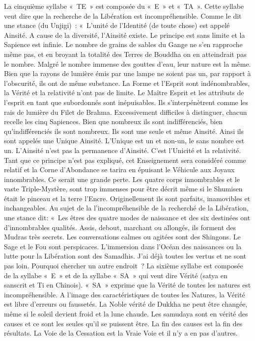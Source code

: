 La cinquième syllabe « TE » est composée du « E » et « TA ». Cette syllabe veut dire que la recherche de la Libération est incompréhensible. Comme le dit une stance (du Unjigi) : « L’unité de l’Identité (de toute chose) est appelé Ainsité. A cause de la diversité, l’Ainsité existe. Le principe est sans limite et la Sapience est infinie. Le nombre de grains de sables du Gange ne s’en rapproche même pas, et en broyant la totalité des Terres de Bouddha on en atteindrait pas le nombre. Malgré le nombre immense des gouttes d’eau, leur nature est la même. Bien que la rayons de lumière émis par une lampe ne soient pas un, par rapport à l’obscurité, ils ont de même substance. La Forme et l’Esprit sont indénombrables, la Vérité et la relativité n’ont pas de limite. Le Maître Esprit et les attributs de l’esprit en tant que subordonnés sont inépuisables. Ils s’interpénètrent comme les rais de lumière du Filet de Brahma. Excessivement difficiles à distinguer, chacun recelle les cinq Sapiences. Bien que nombreux ils sont indifférenciés, bien qu’indifférenciés ils sont nombreux. Ils sont une seule et même Ainsité. Ainsi ils sont appelés une Unique Ainsité. L’Unique est un et non-un, le sans nombre est un. L’Ainsité n’est pas la permanence d’Ainsité. C’est l’Unicité et la relativité. Tant que ce principe n’est pas expliqué, cet Enseignement sera considéré comme relatif et la Corne d’Abondance se tarira en épuisant le Véhicule aux Joyaux innombrables. Ce serait une grande perte.
 Les quatre corps innombrables et le vaste Triple-Mystère, sont trop immenses pour être décrit même si le Shumisen était le pinceau et la terre l’Encre. Originellement ils sont parfaits, inamovibles et inchangeables.
Au sujet de la l’incompréhensible de la recherché de la Libération, une stance dit:  « Les êtres des quatre modes de naissance et des six destinées ont d’innombrables qualités. Assis, debout, marchant ou allongés, ils forment des Mudras très secrets. Les conversations calmes ou agitées sont des Shingons. Le Sage et le Fou sont perspicaces. L’immersion dans l’Océan des naissances ou la lutte pour la Libération sont des Samadhis. J’ai déjà toutes les vertus et ne sont pas loin. Pourquoi chercher un autre endroit ?
La sixième syllabe est composée de la syllabe « E » et de la syllabe « SA » qui veut dire Vérité (satya en sanscrit et Ti en Chinois). « SA » exprime que la Vérité de toutes les natures est incompréhensible. A l’image des caractéristiques de toutes les Natures, la Vérité est libre d’erreurs ou faussetés. La Noble vérité de Dukkha ne peut être changée, même si le soleil devient froid et la lune chaude. Les samudaya sont en vérité des causes et ce sont les seules qu’il se puissent être. La fin des causes est la fin des résultats. La Voie de la Cessation est la Vraie Voie et il n’y a en pas d’autres.

